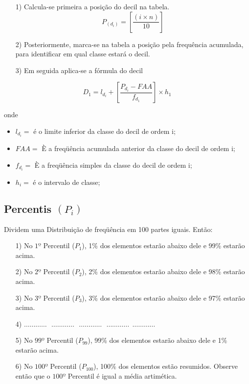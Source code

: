 \begin{enumerate}
\item [{1)}]Calcula-se primeira a posição do decil na tabela.
$$ P_{(d_{i})} = \left[ \frac{(i \times n)}{10} \right] $$
\item [{2)}] Posteriormente, marca-se na tabela a posição pela frequência acumulada, para identificar em qual classe estará o decil.
\item [{3)}] Em seguida aplica-se a fórmula do decil
\end{enumerate}

\begin{equation}\label{}
    D_{1}= l_{d_{i}}+\left[\frac{P_{d_{i}}-FAA}{f_{d_{1}}}\right]\times h_{1}
\end{equation}

 onde

 \begin{itemize}
   \item $l_{d_{i}}=$ é o limite inferior da classe do decil de ordem i;
   \item $FAA=$ È a freqüência acumulada anterior da classe do decil de ordem i;
   \item $f_{d_{i}}=$ È a freqüência simples da classe do decil de ordem i;
   \item $h_{i}=$ é o intervalo de classe;
 \end{itemize}



\subsection{Percentis $(P_{i})$}

Dividem uma Distribuição de freqüência em 100 partes iguais. Então:


\begin{enumerate}
  \item[{1)}] No $1º$ Percentil ($P_{1}$), 1\% dos elementos estarão abaixo dele e 99\% estarão acima.
  \item[{2)}] No $2º$ Percentil ($P_{2}$), 2\% dos elementos estarão abaixo dele e 98\% estarão acima.
  \item[{3)}] No $3º$ Percentil ($P_{3}$), 3\% dos elementos estarão abaixo dele e 97\% estarão acima.
   \item[{4)}] $\ldots \ldots \ldots \ldots \ \ \  \ldots \ldots \ldots \ldots \ \ \  \ldots \ldots \ldots \ldots \ \ \  \ldots \ldots \ldots \ldots \ \ \ldots \ldots \ldots \ldots$
  \item[{5)}] No $99º$ Percentil ($P_{99}$), 99\% dos elementos estarão abaixo dele e 1\% estarão acima.
   \item[{6)}] No $100º$ Percentil ($P_{100}$), 100\% dos elementos estão resumidos. Observe então que o $100º$ Percentil é igual a média artimética.
\end{enumerate}



